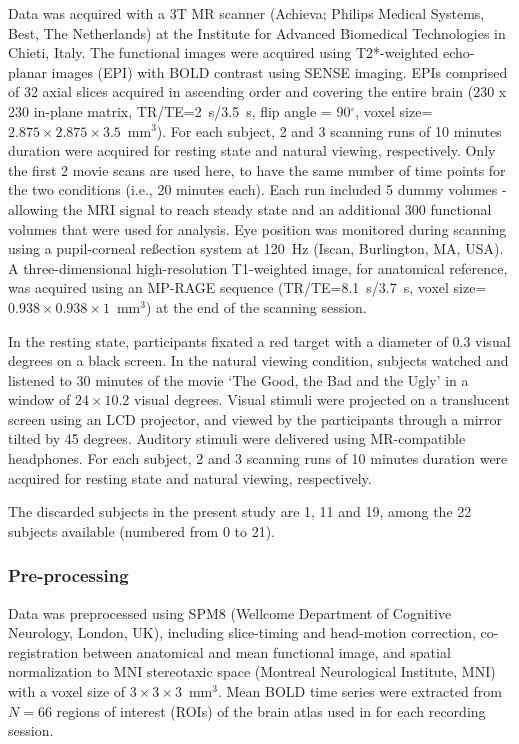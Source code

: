 \documentclass{article}
\begin{document}
Data was acquired with a 3T MR scanner (Achieva; Philips Medical Systems, Best, The Netherlands) at the Institute for Advanced Biomedical Technologies in Chieti, Italy. The functional images were acquired using T2*-weighted echo-planar images (EPI) with BOLD contrast using SENSE imaging. EPIs comprised of 32 axial slices acquired in ascending order and covering the entire brain (230 x 230 in-plane matrix, TR/TE=2~s/3.5~s, flip angle = 90$^\circ$, voxel size=$2.875 \times 2.875 \times 3.5$~mm$^3$). For each subject, 2 and 3 scanning runs of 10 minutes duration were acquired for resting state and natural viewing, respectively. Only the first 2 movie scans are used here, to have the same number of time points for the two conditions (i.e., 20 minutes each). Each run included 5 dummy volumes - allowing the MRI signal to reach steady state and an additional 300 functional volumes that were used for analysis. Eye position was monitored during scanning using a pupil-corneal reßection system at 120~Hz (Iscan, Burlington, MA, USA). A three-dimensional high-resolution T1-weighted image, for anatomical reference, was acquired using an MP-RAGE sequence (TR/TE=8.1~s/3.7~s, voxel size=$0.938 \times 0.938 \times 1$~mm$^3$) at the end of the scanning session.


In the resting state, participants fixated a red target with a diameter of 0.3 visual degrees on a black screen. In the natural viewing condition, subjects watched and listened to 30 minutes of the movie `The Good, the Bad and the Ugly' in a window of $24\times10.2$ visual degrees. Visual stimuli were projected on a translucent screen using an LCD projector, and viewed by the participants through a mirror tilted by 45 degrees. Auditory stimuli were delivered using MR-compatible headphones.
For each subject, 2 and 3 scanning runs of 10 minutes duration were acquired for resting state and natural viewing, respectively. 

The discarded subjects in the present study are 1, 11 and 19, among the 22 subjects available (numbered from 0 to 21).

\subsubsection{Pre-processing}

Data was preprocessed using SPM8 (Wellcome Department of Cognitive Neurology, London, UK), including slice-timing and head-motion correction, co-registration between anatomical and mean functional image, and spatial normalization to MNI stereotaxic space (Montreal Neurological Institute, MNI) with a voxel size of $3 \times 3 \times 3$~mm$^3$. 
Mean BOLD time series were extracted from $N = 66$ regions of interest (ROIs) of the brain atlas used in \cite{Hagmann_PB_2008} for each recording session. 
\end{document}
